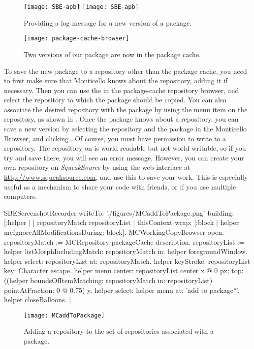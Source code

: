 \documentclass[a4paper,10pt,twoside]{book}
\begin{document}
\begin{figure}[tbp]
	\begin{center}
	\ifluluelse
		{\texttt{[image: SBE-apb]}}
		{\texttt{[image: SBE-apb]}}
	\end{center}
	\caption{Providing a log message for a new version of a package.}
	\label{fig:SBE-apb}
\end{figure}

\begin{figure}[tbp]
	\begin{center}
	\texttt{[image: package-cache-browser]}
	\end{center}
	\caption{Two versions of our package are now in the package cache.}
	\label{fig:package-cache-browser}
\end{figure}

To save the new package to a repository other than the package cache, you need to first make sure that Monticello knows about the repository, adding it if necessary.
Then you can use the  in the package-cache repository browser, and select the repository to which the package should be copied.
You can also associate the desired repository with the package by using the  menu item  on the repository, as shown in .
Once the package knows about a repository, you can save a new version by selecting the repository and the package in the Monticello Browser, and clicking .
Of course, you must have permission to write to a repository.
The  repository on  is world readable but not world writable, so if you try and save there, you will see an error message.
However, you can create your own repository on \emph{SqueakSource} by using the web interface at \url{http://www.squeaksource.com}, and use this to save your work.
This is especially useful as a mechanism to share your code with friends, or if you use multiple computers.

\begin{ExecuteSmalltalkScript}
SBEScreenshotRecorder writeTo: './figures/MCaddToPackage.png' building: [:helper |
	| repositoryMatch repositoryList |
	thisContext wrap: [:block | helper mcIgnoreAllModificationsDuring: block].
	MCWorkingCopyBrowser open.
	repositoryMatch := MCRepository packageCache description.
	repositoryList := helper listMorphIncludingMatch: repositoryMatch in: helper foregroundWindow.
	helper select: repositoryList at: repositoryMatch.
	helper keyStroke: repositoryList key: Character escape.
	helper menu
		center: repositoryList center x @ 0 px;
		top: ((helper boundsOfItemMatching: repositoryMatch in: repositoryList)
			pointAtFraction: 0 @ 0.75) y.
	helper select: helper menu at: 'add to package*'.
	helper closeBalloons.
]
\end{ExecuteSmalltalkScript}
\begin{figure}[tbp]
	\begin{center}
		\texttt{[image: MCaddToPackage]}
	\end{center}
	\caption{Adding a repository to the set of repositories associated with a package.}
	\label{fig:associateRepository}
\end{figure}
\end{document}
